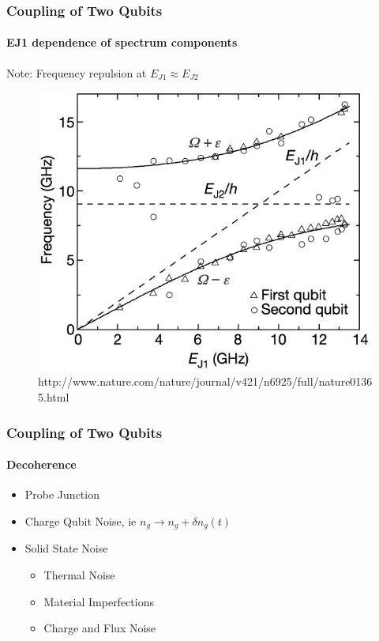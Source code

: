 \documentclass{beamer}
\begin{document}

\begin{frame}
    \frametitle{Coupling of Two Qubits}
    \framesubtitle{EJ1 dependence of spectrum components}
    \begin{block}{}
        \centering
        Note: Frequency repulsion at $E_{J1} \approx E_{J2}$
    \end{block}
    \begin{figure}[ht!]
        \centering
        \includegraphics[height=0.6\textheight]{img/freq-vs-ej1.jpg}
        \caption{http://www.nature.com/nature/journal/v421/n6925/full/nature01365.html}
    \end{figure}
\end{frame}


\begin{frame}
    \frametitle{Coupling of Two Qubits}
    \framesubtitle{Decoherence}
    \centering
    \begin{itemize}
        \item Probe Junction
        \item Charge Qubit Noise, ie $n_g \rightarrow n_g + \delta n_g(t)$
        \item Solid State Noise
        \begin{itemize}
            \item Thermal Noise
            \item Material Imperfections
            \item Charge and Flux Noise
        \end{itemize}
    \end{itemize}
\end{frame}
\end{document}
